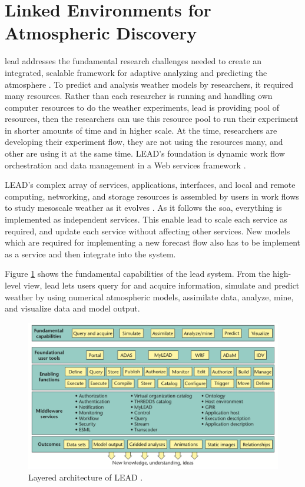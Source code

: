 \section{Linked Environments for Atmospheric Discovery}
\label{se:lead}

\acrfull{lead} addresses the fundamental research challenges needed to create an integrated, scalable framework for adaptive analyzing and predicting the atmosphere \cite{Droegemeier2005Service-OrientedWeather}. To predict and analysis weather models by researchers, it required many resources. Rather than each researcher is running and handling own computer resources to do the weather experiments, \acrshort{lead} is providing pool of resources, then the researchers can use this resource pool to run their experiment in shorter amounts of time and in higher scale. At the time, researchers are developing their experiment flow, they are not using the resources many, and other are using it at the same time. LEAD's foundation is dynamic work flow orchestration and data management in a Web services framework \cite{Droegemeier2005Service-OrientedWeather}.

LEAD's complex array of services, applications, interfaces, and local and remote computing, networking, and storage resources is assembled by users in work flows to study mesoscale weather as it evolves \cite{Droegemeier2005Service-OrientedWeather}. As it follows the \acrshort{soa}, everything is implemented as independent services. This enable \acrshort{lead} to scale each service as required, and update each service without affecting other services. New models which are required for implementing a new forecast flow also has to be implement as a service and then integrate into the system.

Figure \ref{fi:lead_system} shows the fundamental capabilities of the \acrshort{lead} system. From the high-level view, \acrshort{lead} lets users query for and acquire information, simulate and predict weather by using numerical atmospheric models, assimilate data, analyze, mine, and visualize data and model output.

\begin{figure}[htp]
    \centering
    \includegraphics[width=1.0\textwidth]{lit/lead/LEAD-system-Fundamental-capabilities-familiar-to-meteorologists-are-shown-in-the-top_W640.png}
    \caption[Layered architecture of LEAD]{Layered architecture of LEAD \cite{Droegemeier2005Service-OrientedWeather}.}
    \label{fi:lead_system}
\end{figure}

